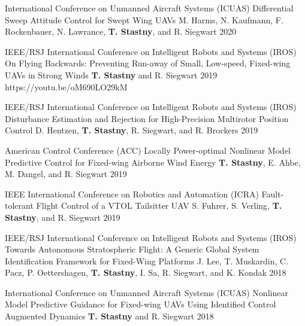 \begin{cventries}
\cvpubentry
	{International Conference on Unmanned Aircraft Systems (ICUAS)} %
	{Differential Sweep Attitude Control for Swept Wing UAVs} %
	{M. Harms, N. Kaufmann, F. Rockenbauer, N. Lawrance, \textbf{T. Stastny}, and R. Siegwart} %
	{} %
	{2020} %
	{} %
	{} %
	
\cvpubentry
	{IEEE/RSJ International Conference on Intelligent Robots and Systems (IROS)} %
	{On Flying Backwards: Preventing Run-away of Small, Low-speed, Fixed-wing UAVs in Strong Winds} %
	{\textbf{T. Stastny} and R. Siegwart} %
	{} %
	{2019} %
	{https://youtu.be/oM690LO29kM} %
	{} %

\cvpubentry
	{IEEE/RSJ International Conference on Intelligent Robots and Systems (IROS)} %
	{Disturbance Estimation and Rejection for High-Precision Multirotor Position Control} %
	{D. Hentzen, \textbf{T. Stastny}, R. Siegwart, and R. Brockers} %
	{} %
	{2019} %
	{} %
	{} %

\cvpubentry
	{American Control Conference (ACC)} %
	{Locally Power-optimal Nonlinear Model Predictive Control for Fixed-wing Airborne Wind Energy} %
	{\textbf{T. Stastny}, E. Ahbe, M. Dangel, and R. Siegwart} %
	{} %
	{2019} %
	{} %
	{} %

\cvpubentry
	{IEEE International Conference on Robotics and Automation (ICRA)} %
	{Fault-tolerant Flight Control of a VTOL Tailsitter UAV} %
	{S. Fuhrer, S. Verling, \textbf{T. Stastny}, and R. Siegwart} %
	{} %
	{2019} %
	{} %
	{} %

\cvpubentry
	{IEEE/RSJ International Conference on Intelligent Robots and Systems (IROS)} %
	{Towards Autonomous Stratospheric Flight: A Generic Global System Identification Framework for Fixed-Wing Platforms} %
	{J. Lee, T. Muskardin, C. Pacz, P. Oettershagen, \textbf{T. Stastny}, I. Sa, R. Siegwart, and K. Kondak} %
	{} %
	{2018} %
	{} %
	{} %

\cvpubentry
	{International Conference on Unmanned Aircraft Systems (ICUAS)} %
	{Nonlinear Model Predictive Guidance for Fixed-wing UAVs Using Identified Control Augmented Dynamics} %
	{\textbf{T. Stastny} and R. Siegwart} %
	{} %
	{2018} %
	{} %
	{} %


\end{cventries}
